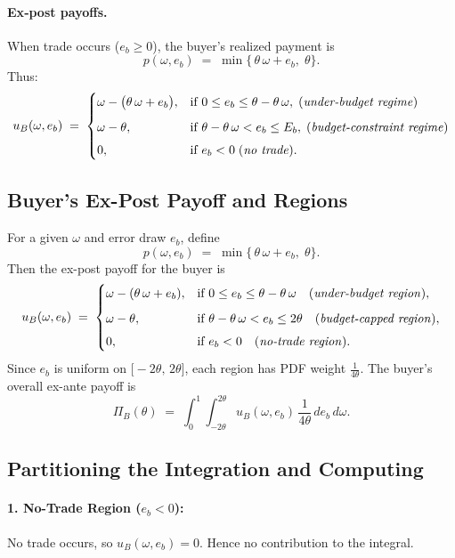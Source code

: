 \documentclass{article}
\begin{document}
\paragraph{Ex‐post payoffs.}
When trade occurs ($e_b \ge 0$), the buyer’s realized payment is 
\[
  p(\omega,e_b) 
  \;=\;
  \min\{\,\theta\,\omega + e_b,\;\theta\}.
\]
Thus:
\[
  u_B(\omega,e_b)
  \;=\;
  \begin{cases}
    \omega - \bigl(\theta\,\omega + e_b\bigr), 
      & \text{if } 0 \le e_b \le \theta - \theta\,\omega, 
        \;\text{(\emph{under‐budget regime})}\\[6pt]
    \omega - \theta, 
      & \text{if } \theta - \theta\,\omega < e_b \le E_b, 
        \;\text{(\emph{budget‐constraint regime})}\\[4pt]
    0, 
      & \text{if } e_b < 0 
        \;\text{(\emph{no trade})}.
  \end{cases}
\]

\subsection*{Buyer’s Ex-Post Payoff and Regions}
For a given \(\omega\) and error draw \(e_b\), define 
\[
p(\omega,e_b) \;=\; \min\{\,\theta\,\omega + e_b,\;\theta\}.
\]
Then the ex-post payoff for the buyer is
\[
u_B(\omega,e_b)
\;=\;
\begin{cases}
\omega - (\theta\,\omega + e_b), 
& \text{if } 0 \le e_b \le \theta - \theta\,\omega 
   \quad\text{(\emph{under-budget region})},\\[6pt]
\omega - \theta, 
& \text{if } \theta - \theta\,\omega < e_b \le 2\theta 
   \quad\text{(\emph{budget-capped region})},\\[4pt]
0, 
& \text{if } e_b < 0 
   \quad\text{(\emph{no-trade region})}.
\end{cases}
\]
Since \(e_b\) is uniform on \(\bigl[-2\theta,\,2\theta\bigr]\), each region has PDF weight \(\tfrac{1}{4\theta}\). The buyer’s overall ex-ante payoff is
\[
\Pi_B(\theta)
\;=\;
\int_0^1 \int_{-2\theta}^{2\theta}
   u_B(\omega,e_b)\,\frac{1}{4\theta}\,d e_b\,d\omega.
\]

\subsection*{Partitioning the Integration and Computing}
\paragraph{1. No-Trade Region (\(e_b<0\)):}
No trade occurs, so \(u_B(\omega,e_b)=0\). Hence no contribution to the integral.
\end{document}
